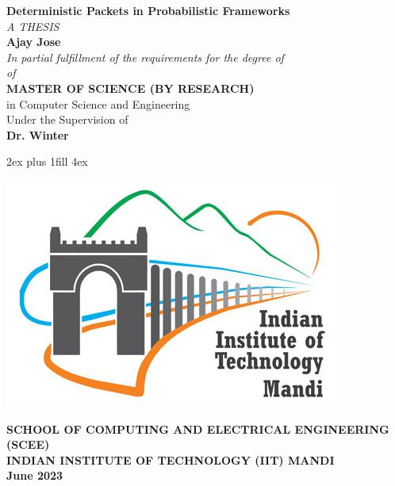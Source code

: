 \thispagestyle{empty}
\setcounter{page}{0}
\vglue 0in
\begin{center}
    {\Large{\bf Deterministic Packets in Probabilistic Frameworks}}\\[5ex]
    {\normalsize \em{A THESIS}}\\[4ex]
    {\large{\bf Ajay Jose}}\\[3ex]
    {\normalsize \em{In partial fulfillment of the requirements for the degree of}}\\[4ex]
    {\normalsize \em{of} }\\[3ex]
    {\large {\bf {MASTER OF SCIENCE (BY RESEARCH)} }}\\[1ex]
    {\normalsize in Computer Science and Engineering}\\[4ex]
    {\large{Under the Supervision of}}\\[1ex]
    {\large{\bf Dr. Winter}}\\

\end{center}

\vglue 2ex plus 1fill  %
\vglue 4ex
\centerline{\includegraphics[scale=0.4]{iitmandi.jpg}}%

\begin{center}
{\normalsize \bf SCHOOL OF COMPUTING AND ELECTRICAL ENGINEERING (SCEE)}\\[1ex]
{\large \bf INDIAN INSTITUTE OF TECHNOLOGY (IIT) MANDI}\\[1ex]
{\bf June 2023}
\end{center}
